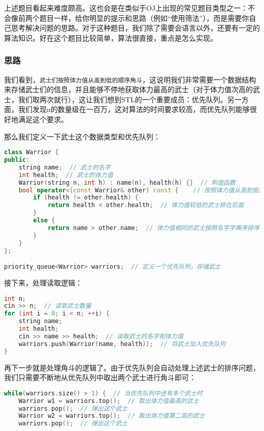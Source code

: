 \begin{answer}
  上述题目看起来难度颇高。这也会是在类似于OJ上出现的常见题目类型之一：不会像前两个题目一样，给你明显的提示和思路（例如“使用筛法”），而是需要你自己思考解决问题的思路。对于这种题目，我们除了需要会语言以外，还要有一定的算法知识。好在这个题目比较简单，算法很直接，重点是怎么实现。

  \subsubsection{思路}
  我们看到，\texttt{武士们按照体力值从高到低的顺序角斗}，这说明我们非常需要一个数据结构来存储武士们的信息，并且能够不停地获取体力最高的武士（对于体力值次高的武士，我们取两次就行），这让我们想到STL的一个重要成员：优先队列。另一方面，我们发现n的数量级在一百万，这对算法的时间要求较高，而优先队列能够很好地满足这个要求。

  那么我们定义一下武士这个数据类型和优先队列：
\begin{lstlisting}[language=C++]
class Warrior {
public:
    string name;  // 武士的名字
    int health;  // 武士的体力值
    Warrior(string n, int h) : name(n), health(h) {}  // 构造函数
    bool operator<(const Warrior& other) const {    // 按照体力值从高到低排序
        if (health != other.health) {
            return health < other.health;  // 体力值较低的武士排在后面
        }
        else {
            return name > other.name;  // 体力值相同的武士按照名字字典序排序
        }
    }
};

priority_queue<Warrior> warriors;  // 定义一个优先队列，存储武士
\end{lstlisting}

  接下来，处理读取逻辑：
\begin{lstlisting}[language=C++]
int n;
cin >> n;  // 读取武士数量
for (int i = 0; i < n; ++i) {
    string name;
    int health;
    cin >> name >> health;  // 读取武士的名字和体力值
    warriors.push(Warrior(name, health));  // 将武士加入优先队列
}
\end{lstlisting}

  再下一步就是处理角斗的逻辑了。由于优先队列会自动处理上述武士的排序问题，我们只需要不断地从优先队列中取出两个武士进行角斗即可：
\begin{lstlisting}[language=C++]
while(warriors.size() > 1) {  // 当优先队列中还有多个武士时
    Warrior w1 = warriors.top();  // 取出体力值最高的武士
    warriors.pop();  // 弹出这个武士
    Warrior w2 = warriors.top();  // 取出体力值第二高的武士
    warriors.pop();  // 弹出这个武士


\end{lstlisting}
\end{answer}
